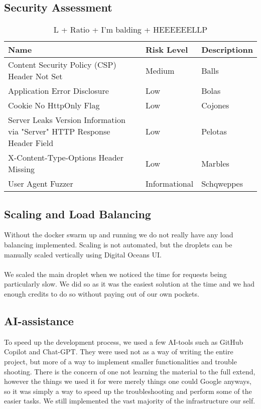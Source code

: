 \subsection*{Security Assessment}

\begin{table}[h]
\begin{tabular}{||>{\centering}m{7cm}| >{\centering}m{2.5cm} |>{\centering\arraybackslash}m{6cm}||}
    \hline
    Name & Risk Level & Descriptionn\\
    \hline\hline
    Content Security Policy (CSP) Header Not Set & Medium & Balls\\
    \hline
    Application Error Disclosure & Low & Bolas\\
    \hline
    Cookie No HttpOnly Flag & Low & Cojones\\
    \hline
    Server Leaks Version Information via "Server" HTTP Response Header Field & Low & Pelotas\\
    \hline
    X-Content-Type-Options Header Missing & Low & Marbles\\
    \hline
    User Agent Fuzzer & Informational & Schqweppes\\
    \hline
\end{tabular}
\caption{L + Ratio + I'm balding + HEEEEEELLP}
\label{table:summary_stats}
\end{table}

\subsection{Scaling and Load Balancing}

Without the docker swarm up and running we do not really have any load balancing implemented. Scaling is not automated, but the droplets can be manually scaled vertically using Digital Oceans UI.
\\\\
We scaled the main droplet when we noticed the time for requests being particularly slow. We did so as it was the easiest solution at the time and we had enough credits to do so without paying out of our own pockets.

\subsection{AI-assistance}

To speed up the development process, we used a few AI-tools such as GitHub Copilot and Chat-GPT. They were used not as a way of writing the entire project, but more of a way to implement smaller functionalities and trouble shooting. There is the concern of one not learning the material to the full extend, however the things we used it for were merely things one could Google anyways, so it was simply a way to speed up the troubleshooting and perform some of the easier tasks. We still implemented the vast majority of the infrastructure our self.